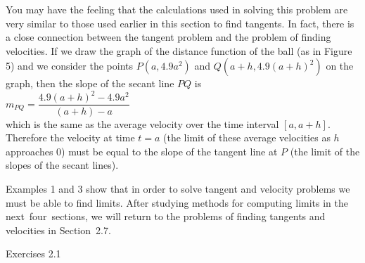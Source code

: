 \documentclass{sebase}
\begin{document}
You may have the feeling that the calculations used in solving this problem
are very similar to those used earlier in this section to find tangents. In
fact, there is a close connection between the tangent problem and the
problem of finding velocities. If we draw the graph of the distance function
of the ball (as in Figure 5) and we consider the points $P(a,4.9a^{2})$ and $%
Q(a+h,4.9(a+h)^{2})$ on the graph, then the slope of the secant line $PQ$ is%
\\[4pt]
\hspace*{\fill}$m_{PQ}=\dfrac{4.9(a+h)^{2}-4.9a^{2}}{(a+h)-a}$\hspace*{\fill}%
\\[6pt]
which is the same as the average velocity over the time interval $[a,a+h]$.
Therefore the velocity at time $t=a$ (the limit of these average velocities
as $h$ approaches 0) must be equal to the slope of the tangent line at $P$
(the limit of the slopes of the secant lines).\\[6pt]
\hspace*{\fill}\hspace*{\fill}%
\vspace*{9pt}

Examples 1 and 3 show that in order to solve tangent and velocity problems
we must be able to find limits. After studying methods for computing limits
in the next\ four\ sections, we will return to the problems of finding
tangents and velocities in Sec\nolinebreak tion~2.7.\vspace{-12pt}

Exercises 2.1
\end{document}
